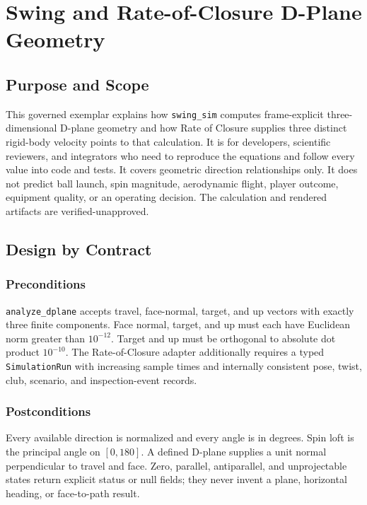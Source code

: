 \documentclass[
  american,
]{article}
\begin{document}
\section{Swing and Rate-of-Closure D-Plane
Geometry}\label{swing-rate-of-closure-d-plane-exemplar}

\subsection{Purpose and Scope}\label{purpose-and-scope}

This governed exemplar explains how \texttt{swing\_sim} computes
frame-explicit three-dimensional D-plane geometry and how Rate of
Closure supplies three distinct rigid-body velocity points to that
calculation. It is for developers, scientific reviewers, and integrators
who need to reproduce the equations and follow every value into code and
tests. It covers geometric direction relationships only. It does not
predict ball launch, spin magnitude, aerodynamic flight, player outcome,
equipment quality, or an operating decision. The calculation and
rendered artifacts are verified-unapproved.

\subsection{Design by Contract}\label{design-by-contract}

\subsubsection{Preconditions}\label{preconditions}

\texttt{analyze\_dplane} accepts travel, face-normal, target, and up
vectors with exactly three finite components. Face normal, target, and
up must each have Euclidean norm greater than \(10^{-12}\). Target and
up must be orthogonal to absolute dot product \(10^{-10}\). The
Rate-of-Closure adapter additionally requires a typed
\texttt{SimulationRun} with increasing sample times and internally
consistent pose, twist, club, scenario, and inspection-event records.

\subsubsection{Postconditions}\label{postconditions}

Every available direction is normalized and every angle is in degrees.
Spin loft is the principal angle on \([0,180]\). A defined D-plane
supplies a unit normal perpendicular to travel and face. Zero, parallel,
antiparallel, and unprojectable states return explicit status or null
fields; they never invent a plane, horizontal heading, or face-to-path
result.
\end{document}
